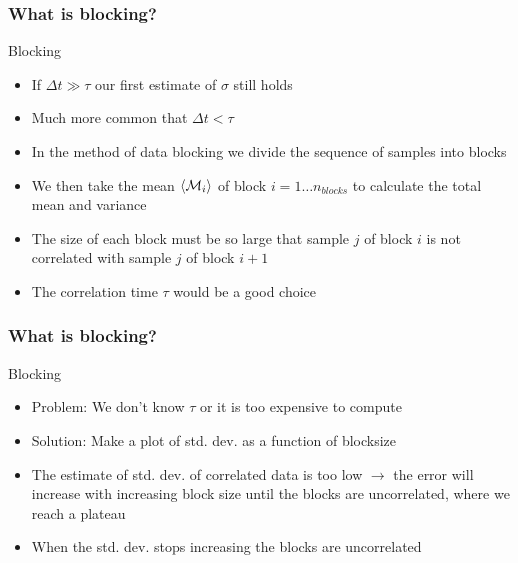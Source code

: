 \documentclass{beamer}
\begin{document}
\begin{frame}
\frametitle{What is blocking?}

\begin{block}{Blocking  }
\begin{itemize}
    \item If $\Delta t\gg\tau$ our first estimate of $\sigma$ still holds

    \item Much more common that $\Delta t<\tau$

    \item In the method of data blocking we divide the sequence of samples into blocks

    \item We then take the mean $\langle {\cal M}_i\rangle$ of block $i=1\ldots n_{blocks}$ to calculate the total mean and variance

    \item The size of each block must be so large that sample $j$ of block $i$ is not correlated with sample $j$ of block $i+1$

    \item The correlation time $\tau$ would be a good choice
\end{itemize}

\noindent
\end{block}
\end{frame}

\begin{frame}
\frametitle{What is blocking?}

\begin{block}{Blocking }
\begin{itemize}
    \item Problem: We don't know $\tau$ or it is too expensive to compute

    \item Solution: Make a plot of std. dev. as a function of blocksize

    \item The estimate of std. dev. of correlated data is too low $\to$ the error will increase with increasing block size until the blocks are uncorrelated, where we reach a plateau

    \item When the std. dev. stops increasing the blocks are uncorrelated
\end{itemize}

\noindent
\end{block}
\end{frame}
\end{document}
